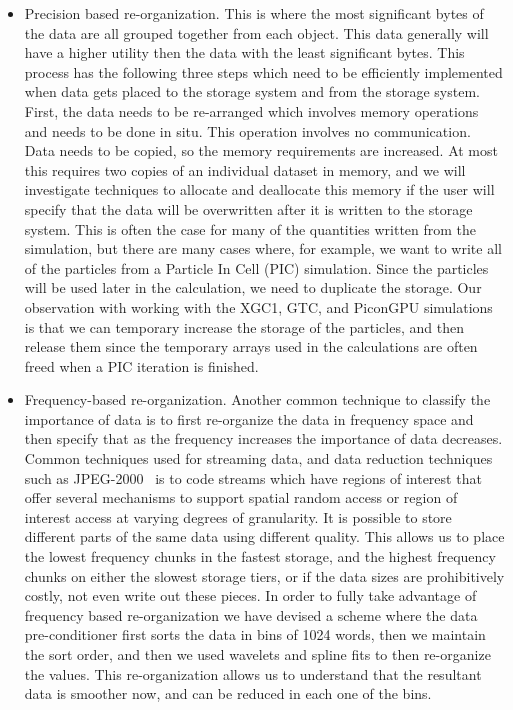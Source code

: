 \begin{itemize} 
	
\item Precision based re-organization. This is where the most significant bytes
	of the data are all grouped together from each object. This data
	generally will have a higher utility then the data with the least
	significant bytes.  This process has the following three steps which
	need to be efficiently implemented when data gets placed to the storage
	system and from the storage system.  First, the data needs to be
	re-arranged which involves memory operations and needs to be done
	in situ. This operation involves no communication.  Data needs to be
	copied, so the memory requirements are increased. At most this requires
	two copies of an individual dataset in memory, and we will investigate
	techniques to allocate and deallocate this memory if the user will
	specify that the data will be overwritten after it is written to the
	storage system. This is often the case for many of the  quantities
	written from the simulation, but there are many cases where, for
	example, we want to write all of the particles from a Particle In Cell
	(PIC) simulation.  Since the particles will be used later in the
	calculation, we need to duplicate the storage. Our observation with
	working with the XGC1, GTC, and PiconGPU simulations 
	 is that we can temporary increase the
	storage of the particles, and then release them since the temporary
	arrays used in the calculations are often freed when a PIC iteration is
	finished. 
%
\item Frequency-based re-organization.  Another common technique to classify
	the importance of data is to first re-organize the data in frequency
	space and then specify that as the frequency increases the importance
	of data decreases.   Common techniques  used for streaming data,
	and data reduction techniques such as JPEG-2000~\cite{jpeg2000} is to
	code streams which have regions of interest that offer several
	mechanisms to support spatial random access or region of interest
	access at varying degrees of granularity. It is possible to store
	different parts of the same data using different quality.  This allows
	us to place the lowest frequency chunks in the fastest storage, and the
	highest frequency chunks  on either  the slowest storage tiers, or if the data
	sizes are prohibitively  costly, not even write out  these pieces. 
	 In order to fully take advantage of frequency based
	re-organization we have devised a scheme where the data pre-conditioner
	first sorts the data in bins of 1024 words, then we maintain the
	sort order, and then we used wavelets and spline fits to then
	re-organize the values.  This re-organization allows us to understand
	that the resultant data is smoother now, and can be reduced in each one
	of the bins.  \end{itemize}

